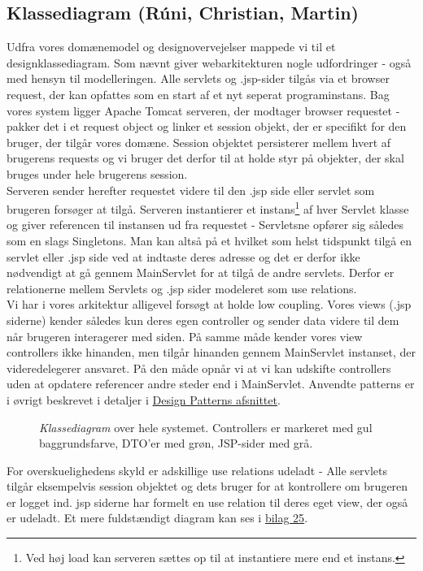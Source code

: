 \subsection*{Klassediagram (Rúni, Christian, Martin)}
Udfra vores domænemodel og designovervejelser mappede vi til et
designklassediagram. Som nævnt giver webarkitekturen nogle udfordringer - også
med hensyn til modelleringen. Alle servlets og .jsp-sider tilgås via et browser
request, der kan opfattes som en start af et nyt seperat programinstans. Bag
vores system ligger Apache Tomcat serveren, der modtager browser requestet -
pakker det i et request object og linker et session objekt, der er specifikt for
den bruger, der tilgår vores domæne. Session objektet persisterer mellem hvert
af brugerens requests og vi bruger det derfor til at holde styr på objekter, der
skal bruges under hele brugerens session.\\
Serveren sender herefter requestet videre til den .jsp side eller servlet som
brugeren forsøger at tilgå. Serveren instantierer et instans\footnote{ Ved høj
load kan serveren sættes op til at instantiere mere end et instans.} af hver
Servlet klasse og giver referencen til instansen ud fra requestet - Servletsne
opfører sig således som en slags Singletons. Man kan altså på et hvilket som
helst tidspunkt tilgå en servlet eller .jsp side ved at indtaste deres adresse
og det er derfor ikke nødvendigt at gå gennem MainServlet for at tilgå de andre
servlets. Derfor er relationerne mellem Servlets og .jsp sider modeleret som use
relations.\\
Vi har i vores arkitektur alligevel forsøgt at holde low coupling. Vores views
(.jsp siderne) kender således kun deres egen controller og sender data videre
til dem når brugeren interagerer med siden. På samme måde kender vores view
controllers ikke hinanden, men tilgår hinanden gennem MainServlet instanset, der
videredelegerer ansvaret. På den måde opnår vi at vi kan udskifte controllers
uden at opdatere referencer andre steder end i MainServlet. Anvendte patterns er
i øvrigt beskrevet i detaljer i \hyperref[design_patterns]{Design Patterns
afsnittet}.
\FloatBarrier
\begin{figure}[h]
\centering
{}
\caption{\emph{Klassediagram} over hele systemet. Controllers er markeret med
gul baggrundsfarve, DTO’er med grøn, JSP-sider med grå. \label{klasse_diagram}}
\end{figure}
\FloatBarrier
For overskuelighedens skyld er adskillige use relations udeladt - Alle servlets
tilgår eksempelvis session objektet og dets bruger for at kontrollere om
brugeren er logget ind. jsp siderne har formelt en use relation til deres eget
view, der også er udeladt. Et mere fuldstændigt diagram kan ses i
\hyperref[Bilag25]{bilag 25}.

